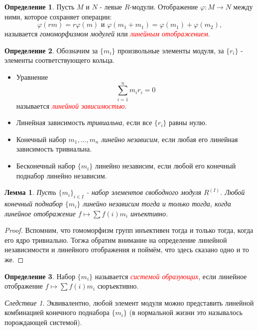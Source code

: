 \documentclass[a4paper,100pt]{article}
\theoremstyle{indented}
\newtheorem{lemma}{Лемма}
\theoremstyle{definition}
\newtheorem{defn}{Определение}
\theoremstyle{remark}
\newtheorem{cons}{Следствие}
\begin{document}
\begin{defn}
    Пусть $M$ и $N$ - левые $R$-модули. Отображение $\varphi: M\rightarrow N$ между ними, которое сохраняет операции:
    \[
        \varphi(rm)=r\varphi(m) \text{ и } \varphi(m_1+m_1)=\varphi(m_1)+\varphi(m_2), 
    \]
    называется \textit{гомоморфизмом модулей} или \hypertarget{n48}{\textcolor{red}{\textit{линейным отображением}}}.
\end{defn}

\begin{defn}
    Обозначим за $\{m_i\}$ произвольные элементы модуля, за $\{r_i\}$ - элементы соответствующего кольца.\ 

    \begin{itemize}
        \item Уравнение 
        \[
            \sum_{i=1}^n m_i r_i=0
        \]
        называется \hypertarget{n43}{\textcolor{red}{\textit{линейной зависимостью}}}.
        \item Линейная зависимость \textit{тривиальна}, если все $\{r_i\}$ равны нулю.
        \item Конечный набор $m_1, \dots, m_n$ \textit{линейно независим}, если любая его линейная зависимость тривиальна.
        \item Бесконечный набор $\{m_i\}$ линейно независим, если любой его конечный поднабор линейно независим.
    \end{itemize}
\end{defn}

\begin{lemma}
    Пусть $\{m_i\}_{i\in I}$ - набор элементов свободного модуля $R^{(I)}$. Любой конечный поднабор $\{m_i\}$ линейно независим тогда и только тогда, когда линейное отображение $f\mapsto \sum f(i)m_i$ инъективно.
\end{lemma}

\begin{proof}
    Вспомним, что гомоморфизм групп инъективен тогда и только тогда, когда его ядро тривиально. Тогжа обратим внимание на определение линейной независимости и линейного отображения и поймём, что здесь сказано одно и то же.
\end{proof}

\begin{defn}
    Набор $\{m_i\}$ называется \hypertarget{n44}{\textcolor{red}{\textit{системой образующих}}}, если линейное отображение $f\mapsto \sum f(i)m_i$ сюръективно.
\end{defn}

\begin{cons}
    Эквивалентно, любой элемент модуля можно представить линейной комбинацией конечного поднабора $\{m_i\}$ (в нормальной жизни это называлось порождающей системой).
\end{cons}
\end{document}
